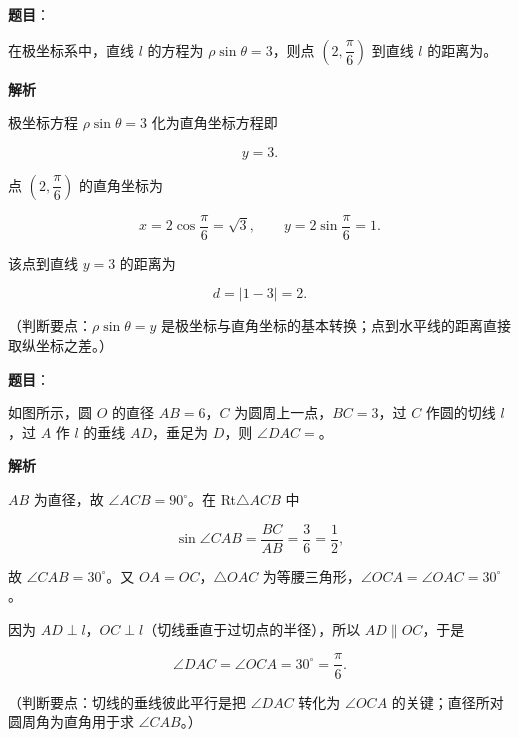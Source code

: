 \begin{answer}

\textbf{题目}：

在极坐标系中，直线 $l$ 的方程为 $\rho\sin\theta=3$，则点 $\left(2,\dfrac{\pi}{6}\right)$ 到直线 $l$ 的距离为\gkblank{}。

\textbf{解析}

极坐标方程 $\rho\sin\theta=3$ 化为直角坐标方程即

\nopagebreak[4]
\[y=3.\]

点 $\left(2,\dfrac{\pi}{6}\right)$ 的直角坐标为

\nopagebreak[4]
\[x=2\cos\frac{\pi}{6}=\sqrt3,\qquad y=2\sin\frac{\pi}{6}=1.\]

该点到直线 $y=3$ 的距离为

\nopagebreak[4]
\[d=|1-3|=2.\]

（判断要点：$\rho\sin\theta=y$ 是极坐标与直角坐标的基本转换；点到水平线的距离直接取纵坐标之差。）


\end{answer}
\begin{answer}

\textbf{题目}：

如图所示，圆 $O$ 的直径 $AB=6$，$C$ 为圆周上一点，$BC=3$，过 $C$ 作圆的切线 $l$，过 $A$ 作 $l$ 的垂线 $AD$，垂足为 $D$，则 $\angle DAC=$\gkblank{}。
\nopagebreak[4]
\begin{center}\end{center}
\nopagebreak[4]
\textbf{解析}

$AB$ 为直径，故 $\angle ACB=90^\circ$。在 Rt$\triangle ACB$ 中

\nopagebreak[4]
\[\sin\angle CAB=\frac{BC}{AB}=\frac36=\frac12,\]

故 $\angle CAB=30^\circ$。又 $OA=OC$，$\triangle OAC$ 为等腰三角形，$\angle OCA=\angle OAC=30^\circ$。

因为 $AD\perp l$，$OC\perp l$（切线垂直于过切点的半径），所以 $AD\parallel OC$，于是

\nopagebreak[4]
\[\angle DAC=\angle OCA=30^\circ=\frac{\pi}{6}.\]

（判断要点：切线的垂线彼此平行是把 $\angle DAC$ 转化为 $\angle OCA$ 的关键；直径所对圆周角为直角用于求 $\angle CAB$。）


\end{answer}
